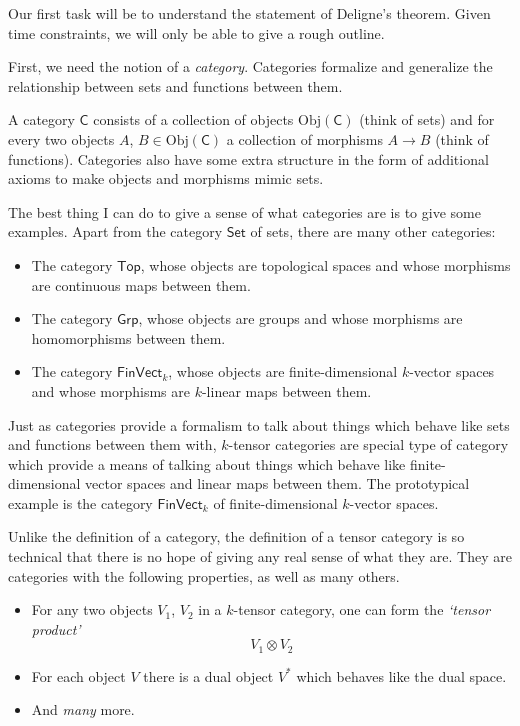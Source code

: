 \documentclass[a4paper,10pt]{scrreprt}
\newcommand{\Obj}{\mathrm{Obj}}
\theoremstyle{definition}
\theoremstyle{plain}
\theoremstyle{remark}
\begin{document}
Our first task will be to understand the statement of Deligne's theorem. Given time constraints, we will only be able to give a rough outline.

First, we need the notion of a \emph{category}. Categories formalize and generalize the relationship between sets and functions between them.

A category $\mathsf{C}$ consists of a collection of objects $\Obj(\mathsf{C})$ (think of sets) and for every two objects $A$, $B \in \Obj(\mathsf{C})$ a collection of morphisms $A \to B$ (think of functions). Categories also have some extra structure in the form of additional axioms to make objects and morphisms mimic sets. 

The best thing I can do to give a sense of what categories are is to give some examples. Apart from the category $\mathsf{Set}$ of sets, there are many other categories:
\begin{itemize}
  \item The category $\mathsf{Top}$, whose objects are topological spaces and whose morphisms are continuous maps between them.

  \item The category $\mathsf{Grp}$, whose objects are groups and whose morphisms are homomorphisms between them.

  \item The category $\mathsf{FinVect}_{k}$, whose objects are finite-dimensional $k$-vector spaces and whose morphisms are $k$-linear maps between them.
\end{itemize}

Just as categories provide a formalism to talk about things which behave like sets and functions between them with, $k$-tensor categories are special type of category which provide a means of talking about things which behave like finite-dimensional vector spaces and linear maps between them. The prototypical example is the category $\mathsf{FinVect}_{k}$ of finite-dimensional $k$-vector spaces.

Unlike the definition of a category, the definition of a tensor category is so technical that there is no hope of giving any real sense of what they are. They are categories with the following properties, as well as many others.
\begin{itemize}
  \item For any two objects $V_{1}$, $V_{2}$ in a $k$-tensor category, one can form the \emph{`tensor product'}
    \begin{equation*}
      V_{1} \otimes V_{2}
    \end{equation*}

  \item For each object $V$ there is a dual object $V^{*}$ which behaves like the dual space.

  \item And \emph{many} more. 
\end{itemize}
\end{document}
